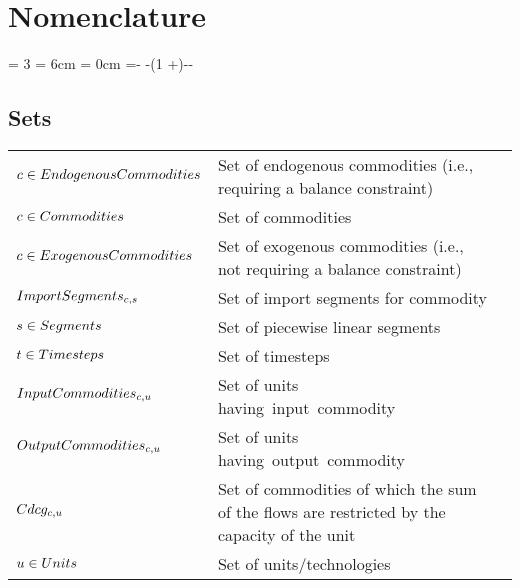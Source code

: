 \section*{Nomenclature}
\newcount\totalcol
\totalcol = 3
\newdimen\cola
\cola = 6cm
\newdimen\colb
\colb = 0cm
\newdimen\colc
\colc =\dimexpr\textwidth -\tabcolsep * -\arrayrulewidth * (1 +\totalcol)-\cola -\colb\relax
\subsection*{Sets}
\vspace{-1em}
	\begin{longtable}{p{\cola} p{\colc} >{\small\raggedleft\arraybackslash\itshape}p{\colb}}
		$c \in EndogenousCommodities$	& Set of endogenous commodities (i.e., requiring a balance constraint)	&                \\
		$c \in Commodities   $	& Set of commodities                                          	&                \\
		$c \in ExogenousCommodities$	& Set of exogenous commodities (i.e., not requiring a balance constraint)	&                \\
		$ImportSegments_{c,s}$	& Set of import segments \segment for commodity \commodity    	&                \\
		$s \in Segments      $	& Set of piecewise linear segments                            	&                \\
		$t \in Timesteps     $	& Set of timesteps                                            	&                \\
		$InputCommodities_{c,u}$	& Set of units \unit having input commodity  \commodity       	&                \\
		$OutputCommodities_{c,u}$	& Set of units \unit having output commodity \commodity       	&                \\
		$Cdcg_{c,u}          $	& Set of commodities of which the sum of the flows are restricted by the capacity of the unit	&                \\
		$u \in Units         $	& Set of units/technologies                                   	&                \\
	\end{longtable}

